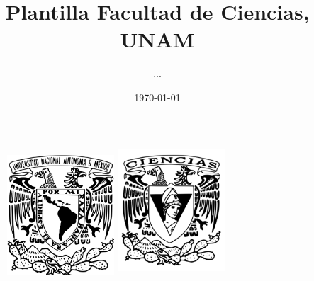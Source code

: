 \documentclass{article}
\title{Plantilla Facultad de Ciencias, UNAM}
\author{...}
\date{\today}
\begin{document}
\thispagestyle{empty}
	
	\begin{figure}[ht]
			\includegraphics[width=4cm]{../Img/Logo_UNAM(1).png}
			\label{EscudoUNAM}
	   \endminipage
			\includegraphics[height = 4.9cm ,width=4cm]{../Img/Logo_FC(1).png}
			\label{EscudoFC}
		\endminipage
	\end{figure}
	
\end{document}
